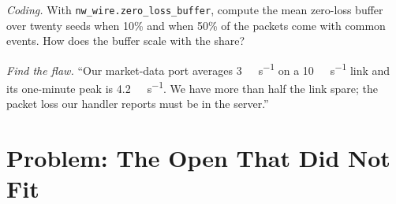 \begin{exercise}[$\star\star\star$]\label{exo:nw:networking-for-trading:7}
\emph{Coding.} With \texttt{nw\_wire.zero\_loss\_buffer}, compute the mean zero-loss buffer over twenty seeds when 10\% and when
50\% of the packets come with common events. How does the buffer scale with the share?
\end{exercise}

\begin{exercise}[$\star\star\star$]\label{exo:nw:networking-for-trading:8}
\emph{Find the flaw.} ``Our market-data port averages \qty{3}{\giga\bit\per\second} on a \qty{10}{\giga\bit\per\second} link and
its one-minute peak is \qty{4.2}{\giga\bit\per\second}. We have more than half the link spare; the packet loss our handler
reports must be in the server.''
\end{exercise}

\section{Problem: The Open That Did Not Fit}

